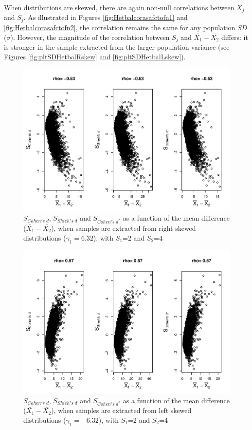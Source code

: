 \documentclass[
  english,
  man,mask]{apa6}
\begin{document}
When distributions are skewed, there are again non-null correlations between \(\bar{X_j}\) and \(S_j\). As illustrated in Figures \ref{fig:Hetbalcorasafctofn1} and \ref{fig:Hetbalcorasafctofn2}, the correlation remains the same for any population \(SD\) (\(\sigma\)). However, the magnitude of the correlation between \(S_j\) and \(\bar{X_1}-\bar{X_2}\) differs: it is stronger in the sample extracted from the larger population variance (see Figures \ref{fig:pltSDHetbalRskew} and \ref{fig:pltSDHetbalLskew}).

\begin{figure}
\centering
\includegraphics{Correlation_files/figure-latex/pltStdzrHetbalRskew-1.pdf}
\caption{\label{fig:pltStdzrHetbalRskew}\(S_{Cohen's \; d}\), \(S_{Shieh's \; d}\) and \(S_{Cohen's \; d^*}\) as a function of the mean difference (\(\bar{X_1}-\bar{X_2}\)), when samples are extracted from right skewed distributions (\(\gamma_1 = 6.32\)), with \(S_1\)=2 and \(S_2\)=4}
\end{figure}

\begin{figure}
\centering
\includegraphics{Correlation_files/figure-latex/pltStdzrHetbalLskew-1.pdf}
\caption{\label{fig:pltStdzrHetbalLskew}\(S_{Cohen's \; d}\), \(S_{Shieh's \; d}\) and \(S_{Cohen's \; d^*}\) as a function of the mean difference (\(\bar{X_1}-\bar{X_2}\)), when samples are extracted from left skewed distributions (\(\gamma_1 = -6.32\)), with \(S_1\)=2 and \(S_2\)=4}
\end{figure}
\end{document}
